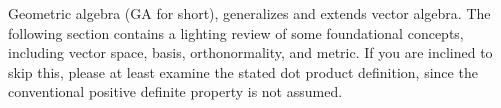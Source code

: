 %
%
Geometric algebra (GA for short), generalizes and extends vector algebra.
The following section contains a lighting review of some 
foundational concepts, including
vector space, basis, orthonormality, and metric.
If you are inclined to skip this, please at least examine the
stated dot product definition, since the conventional positive definite property is not assumed.
